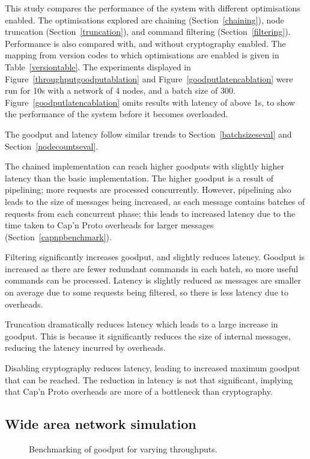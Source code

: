 This study compares the performance of the system with different optimisations enabled. The optimisations explored are chaining (Section~\ref{chaining}), node truncation (Section~\ref{truncation}), and command filtering (Section~\ref{filtering}). Performance is also compared with, and without cryptography enabled. The mapping from version codes to which optimisations are enabled is given in Table~\ref{versiontable}. The experiments displayed in Figure~\ref{throughputgoodputablation} and Figure~\ref{goodputlatencablation} were run for 10s with a network of 4 nodes, and a batch size of 300. Figure~\ref{goodputlatencablation} omits results with latency of above 1s, to show the performance of the system before it becomes overloaded.

The goodput and latency follow similar trends to Section~\ref{batchsizeseval} and Section~\ref{nodecountseval}.

The chained implementation can reach higher goodputs with slightly higher latency than the basic implementation. The higher goodput is a result of pipelining; more requests are processed concurrently. However, pipelining also leads to the size of messages being increased, as each message contains batches of requests from each concurrent phase; this leads to increased latency due to the time taken to Cap'n Proto overheads for larger messages (Section~\ref{capnpbenchmark}).

Filtering significantly increases goodput, and slightly reduces latency. Goodput is increased as there are fewer redundant commands in each batch, so more useful commands can be processed. Latency is slightly reduced as messages are smaller on average due to some requests being filtered, so there is less latency due to overheads.

Truncation dramatically reduces latency which leads to a large increase in goodput. This is because it significantly reduces the size of internal messages, reducing the latency incurred by overheads.

Disabling cryptography reduces latency, leading to increased maximum goodput that can be reached. The reduction in latency is not that significant, implying that Cap'n Proto overheads are more of a bottleneck than cryptography.

\subsection{Wide area network simulation} \label{minineteval}

\begin{figure}[h!]
\centering
\resizebox{.6\textwidth}{!}{}
\caption{Benchmarking of goodput for varying throughputs.}
\label{throughoutgoodputmininet}
\end{figure}

